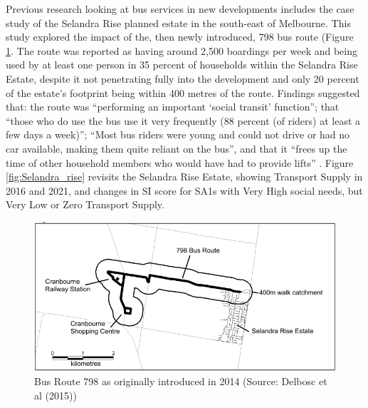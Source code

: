 \documentclass[preprint, 3p,
authoryear]{elsarticle} %
\begin{document}
Previous research looking at bus services in new developments includes
the \citet{delbosc2015impact} case study of the Selandra Rise planned
estate in the south-east of Melbourne. This study explored the impact of
the, then newly introduced, 798 bus route (Figure \ref{fig:Bus_798}. The
route was reported as having around 2,500 boardings per week and being
used by at least one person in 35 percent of households within the
Selandra Rise Estate, despite it not penetrating fully into the
development and only 20 percent of the estate's footprint being within
400 metres of the route. Findings suggested that: the route was
``performing an important `social transit' function''; that ``those who
do use the bus use it very frequently (88 percent (of riders) at least a
few days a week)''; ``Most bus riders were young and could not drive or
had no car available, making them quite reliant on the bus'', and that
it ``frees up the time of other household members who would have had to
provide lifts'' \citep[p.10]{delbosc2015impact}. Figure
\ref{fig:Selandra_rise} revisits the Selandra Rise Estate, showing
Transport Supply in 2016 and 2021, and changes in SI score for SA1s with
Very High social needs, but Very Low or Zero Transport Supply.

\begin{figure}

{\centering \includegraphics[width=1\linewidth]{graphics/Route798} 

}

\caption{Bus Route 798 as originally introduced in 2014 (Source: Delbosc et al (2015))}\label{fig:Bus_798}
\end{figure}
\end{document}

